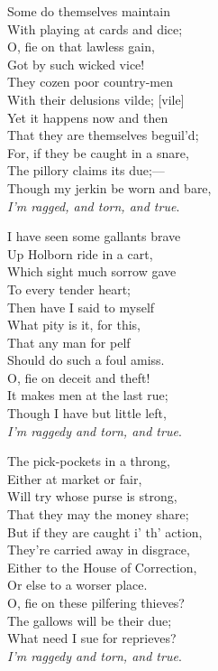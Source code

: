 \begin{dcverse}
\begin{altverse}
Some do themselves maintain\\
With playing at cards and dice;\\
O, fie on that lawless gain,\\
Got by such wicked vice!\\
They cozen poor country-men\\
With their delusions vilde; [vile]\\
Yet it happens now and then\\
That they are themselves beguil’d;\\
For, if they be caught in a snare,\\
The pillory claims its due;—\\
Though my jerkin be worn and bare,\\
\textit{I'm ragged, and torn, and true}.
\end{altverse}

\begin{altverse}
I have seen some gallants brave\\
Up Holborn ride in a cart,\\
Which sight much sorrow gave\\
To every tender heart;\\
Then have I said to myself\\
What pity is it, for this,\\
That any man for pelf\\
Should do such a foul amiss.\\
O, fie on deceit and theft!\\
It makes men at the last rue;\\
Though I have but little left,\\
\textit{I’m raggedy and torn, and true}.
\end{altverse}

\begin{altverse}
The pick-pockets in a throng,\\
Either at market or fair,\\
Will try whose purse is strong,\\
That they may the money share;\\
But if they are caught i’ th’ action,\\
They’re carried away in disgrace,\\
Either to the House of Correction,\\
Or else to a worser place.\\
O, fie on these pilfering thieves?\\
The gallows will be their due;\\
What need I sue for reprieves?\\
\textit{I’m raggedy and torn, and true}.
\end{altverse}


\end{dcverse}
